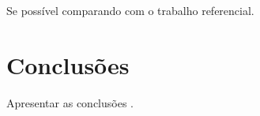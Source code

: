 \documentclass[12pt]{article}
\begin{document}
Se possível comparando com o trabalho referencial.

\section{Conclusões}

Apresentar as conclusões  \cite{dzwinel:04}.





\end{document}
